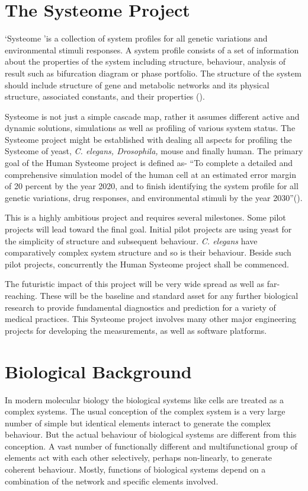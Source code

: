 \section{The Systeome Project}
\lq Systeome \rq is a collection of system profiles for all genetic variations and environmental stimuli responses. A system profile consists of a set of information about the properties of the system including structure, behaviour, analysis of result such as bifurcation diagram or phase portfolio. The structure of the system should include structure of gene and metabolic networks and its physical structure, associated constants, and their properties (\cite{Kitano:2002}).

Systeome is not just a simple cascade map, rather it assumes different active and dynamic solutions, simulations as well as profiling of various system status. The Systeome project might be established with dealing all aspects for profiling the Systeome of yeast, \textit{C. elegans, Drosophila,} mouse and finally human. The primary goal of the Human Systeome project is defined as- ``To complete a detailed and comprehensive simulation model of the human cell at an estimated error margin of 20 percent by the year 2020, and to finish identifying the system profile for all genetic variations, drug responses, and environmental stimuli by the year 2030''(\cite{Kitano:2002}).

This is a highly ambitious project and requires several milestones. Some pilot projects will lead toward the final goal. Initial pilot projects are using yeast for the simplicity of structure and subsequent behaviour. \textit{C. elegans} have comparatively complex system structure and so is their behaviour. Beside such pilot projects, concurrently the Human Systeome project shall be commenced.

The futuristic impact of this project will be very wide spread as well as far-reaching. These will be the baseline and standard asset for any further biological research to provide fundamental diagnostics and prediction for a variety of medical practices. This Systeome project involves many other major engineering projects for developing the measurements, as well as software platforms.

\section{Biological Background}
In modern molecular biology the biological systems like cells are treated as a complex systems. The usual conception of the complex system is a very large number of simple but identical elements interact to generate the complex behaviour. But the actual behaviour of biological systems are different from this conception. A vast number of functionally different and multifunctional group of elements act with each other selectively, perhaps non-linearly, to generate coherent behaviour. Mostly, functions of biological systems depend on a combination of the network and specific elements involved. 

